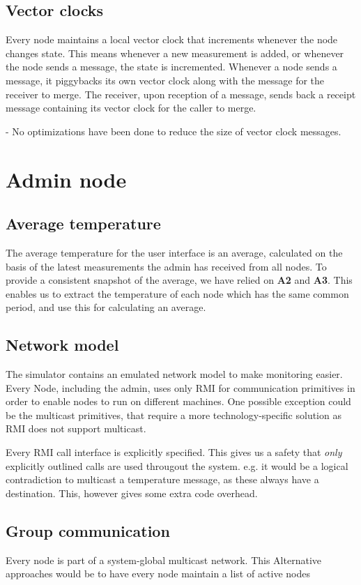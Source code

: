 \documentclass[10pt,a4paper]{article}
\begin{document}
\subsection{Vector clocks}
Every node maintains a local vector clock that increments whenever the node changes state. This means whenever a new measurement is added, or whenever the node sends a message, the state is incremented. Whenever a node sends a message, it piggybacks its own vector clock along with the message for the receiver to merge. The receiver, upon reception of a message, sends back a receipt message containing its vector clock for the caller to merge.

- No optimizations have been done to reduce the size of vector clock messages.

\section{Admin node}
\subsection{Average temperature}
The average temperature for the user interface is an average, calculated on the basis of the latest measurements the admin has received from all nodes. To provide a consistent snapshot of the average, we have relied on \textbf{A2} and \textbf{A3}. This enables us to extract the temperature of each node which has the same common period, and use this for calculating an average.

\subsection{Network model}
The simulator contains an emulated network model to make monitoring easier. Every Node, including the admin, uses only RMI for communication primitives in order to enable nodes to run on different machines.
One possible exception could be the multicast primitives, that require a more technology-specific solution as RMI does not support multicast.

Every RMI call interface is explicitly specified. This gives us a safety that \emph{only} explicitly outlined calls are used througout the system. e.g. it would be a logical contradiction to multicast a temperature message, as these always have a destination. This, however gives some extra code overhead.

\subsection{Group communication}
Every node is part of a system-global multicast network. This
Alternative approaches would be to have every node maintain a list of active nodes
\end{document}
